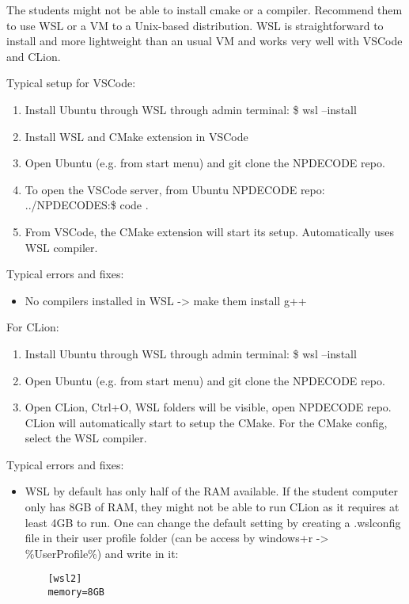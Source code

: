 The students might not be able to install cmake or a compiler. Recommend them to use WSL or a VM to a Unix-based distribution. WSL is straightforward to install and more lightweight than an usual VM and works very well with VSCode and CLion. 

Typical setup for VSCode:
\begin{enumerate}
    \item Install Ubuntu through WSL through admin terminal: \$ wsl --install
    \item Install WSL and CMake extension in VSCode
    \item Open Ubuntu (e.g. from start menu) and git clone the NPDECODE repo. 
    \item To open the VSCode server, from Ubuntu NPDECODE repo: ../NPDECODES:\$ code . 
    \item From VSCode, the CMake extension will start its setup. Automatically uses WSL compiler.
\end{enumerate}

Typical errors and fixes:
\begin{itemize}
    \item No compilers installed in WSL -> make them install g++
\end{itemize}

For CLion:
\begin{enumerate}
    \item Install Ubuntu through WSL through admin terminal: \$ wsl --install
    \item Open Ubuntu (e.g. from start menu) and git clone the NPDECODE repo. 
    \item Open CLion, Ctrl+O, WSL folders will be visible, open NPDECODE repo. CLion will automatically start to setup the CMake. For the CMake config, select the WSL compiler.
\end{enumerate}

Typical errors and fixes:
\begin{itemize}
    \item
    WSL by default has only half of the RAM available. If the student computer only has 8GB of RAM, they might not be able to run CLion as it requires at least 4GB to run. One can change the default setting by creating a .wslconfig file in their user profile folder (can be access by windows+r -> \%UserProfile\%) and write in it:
    \begin{lstlisting}
    [wsl2]
    memory=8GB
    \end{lstlisting}
\end{itemize}








